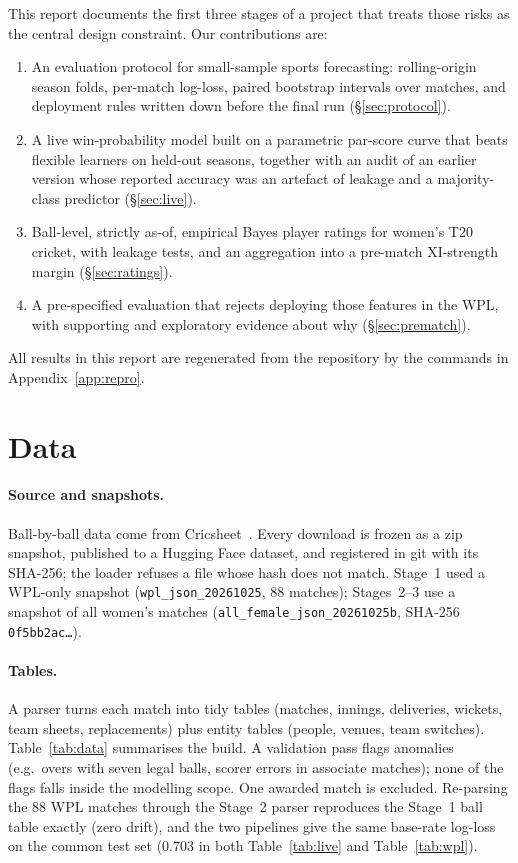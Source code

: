 \documentclass[11pt]{article}
\newcommand{\code}[1]{\texttt{#1}}
\begin{document}
This report documents the first three stages of a project that treats those risks as the central design
constraint. Our contributions are:
\begin{enumerate}
  \item An evaluation protocol for small-sample sports forecasting: rolling-origin season folds,
        per-match log-loss, paired bootstrap intervals over matches, and deployment rules written down
        before the final run (\S\ref{sec:protocol}).
  \item A live win-probability model built on a parametric par-score curve that beats flexible learners
        on held-out seasons, together with an audit of an earlier version whose reported accuracy was an
        artefact of leakage and a majority-class predictor (\S\ref{sec:live}).
  \item Ball-level, strictly as-of, empirical Bayes player ratings for women's T20 cricket, with
        leakage tests, and an aggregation into a pre-match XI-strength margin (\S\ref{sec:ratings}).
  \item A pre-specified evaluation that rejects deploying those features in the WPL, with supporting and
        exploratory evidence about why (\S\ref{sec:prematch}).
\end{enumerate}
All results in this report are regenerated from the repository by the commands in Appendix~\ref{app:repro}.

\section{Data}\label{sec:data}

\paragraph{Source and snapshots.} Ball-by-ball data come from Cricsheet~\citep{cricsheet}. Every
download is frozen as a zip snapshot, published to a Hugging Face dataset, and registered in git with its
SHA-256; the loader refuses a file whose hash does not match. Stage~1 used a WPL-only snapshot
(\code{wpl\_json\_20261025}, 88 matches); Stages~2--3 use a snapshot of all women's matches
(\code{all\_female\_json\_20261025b}, SHA-256 \code{0f5bb2ac\ldots}).

\paragraph{Tables.} A parser turns each match into tidy tables (matches, innings, deliveries, wickets,
team sheets, replacements) plus entity tables (people, venues, team switches). Table~\ref{tab:data}
summarises the build. A validation pass flags anomalies (e.g.\ overs with seven legal balls, scorer
errors in associate matches); none of the flags falls inside the modelling scope. One awarded match is
excluded. Re-parsing the 88 WPL matches through the Stage~2 parser reproduces the Stage~1 ball table
exactly (zero drift), and the two pipelines give the same base-rate log-loss on the common test set
(0.703 in both Table~\ref{tab:live} and Table~\ref{tab:wpl}).
\end{document}

